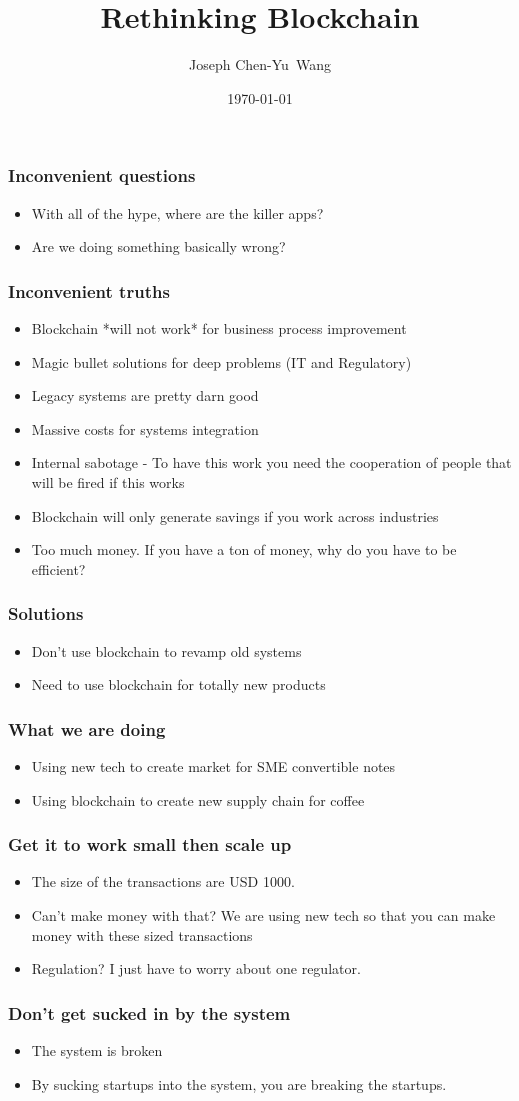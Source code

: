 \documentclass{beamer}
\title {Rethinking Blockchain}
\author{Joseph Chen-Yu~Wang}
\institute{Bitquant Research Laboratories (Asia) Limited}
\date{\today}
\begin{document}
\frame{\titlepage}
\begin{frame}
  \frametitle{Inconvenient questions}
  \begin{itemize}
  \item With all of the hype, where are the killer apps?
  \item Are we doing something basically wrong?
    \end{itemize}
\end{frame}
\begin{frame}
  \frametitle{Inconvenient truths}
  \begin{itemize}
  \item Blockchain *will not work* for business process improvement
  \item Magic bullet solutions for deep problems (IT and Regulatory)
  \item Legacy systems are pretty darn good
  \item Massive costs for systems integration
  \item Internal sabotage - To have this work you need the
    cooperation of people that will be fired if this works
  \item Blockchain will only generate savings if you work across
    industries
  \item Too much money.  If you have a ton of money, why do you have
    to be efficient?
  \end{itemize}
\end{frame}
\begin{frame}
  \frametitle{Solutions}
  \begin{itemize}
  \item Don't use blockchain to revamp old systems
  \item Need to use blockchain for totally new products
  \end{itemize}
\end{frame}
\begin{frame}
  \frametitle{What we are doing}
  \begin{itemize}
  \item Using new tech to create market for SME convertible notes
  \item Using blockchain to create new supply chain for coffee
  \end{itemize}
\end{frame}
\begin{frame}
  \frametitle{Get it to work small then scale up}
  \begin{itemize}
  \item The size of the transactions are USD 1000.
  \item Can't make money with that?  We are using new tech so that
    you can make money with these sized transactions
  \item Regulation?  I just have to worry about one regulator.
  \end{itemize}
\end{frame}
\begin{frame}
  \frametitle{Don't get sucked in by the system}
  \begin{itemize}
  \item The system is broken
    \item By sucking startups into the system, you are breaking the
      startups.
  \end{itemize}
\end{frame}
\end{document}
